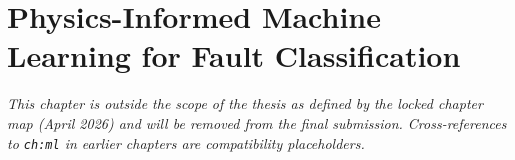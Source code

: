 \chapter{Physics-Informed Machine Learning for Fault Classification}
\label{ch:ml}

\emph{This chapter is outside the scope of the thesis as defined by the locked
chapter map (April 2026) and will be removed from the final submission.
Cross-references to \texttt{ch:ml} in earlier chapters are compatibility
placeholders.}

